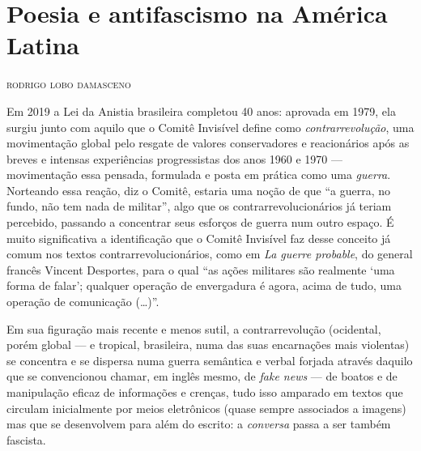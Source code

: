 \chapter[Poesia e antifascismo na América Latina]{Poesia e antifascismo na América Latina } 

\hfill\textsc{rodrigo lobo damasceno}

\bigskip

Em 2019 a Lei da Anistia brasileira completou 40 anos: aprovada em 1979,
ela surgiu junto com aquilo que o Comitê Invisível define como
\emph{contrarrevolução}, uma movimentação global pelo resgate de valores
conservadores e reacionários após as breves e intensas experiências
progressistas dos anos 1960 e 1970 --- movimentação essa pensada, formulada e
posta em prática como uma \emph{guerra}. Norteando essa reação, diz o
Comitê, estaria uma noção de que ``a guerra, no fundo, não tem nada de
militar'', algo que os contrarrevolucionários já teriam percebido,
passando a concentrar seus esforços de guerra num outro espaço. É muito
significativa a identificação que o Comitê Invisível faz desse conceito
já comum nos textos contrarrevolucionários, como em \emph{La guerre
probable}, do general francês Vincent Desportes, para o qual ``as ações
militares são realmente `uma forma de falar'; qualquer operação de
envergadura é agora, acima de tudo, uma operação de comunicação (\ldots{})''.

\asterisc

Em sua figuração mais recente e menos sutil, a contrarrevolução
(ocidental, porém global --- e tropical, brasileira, numa das suas
encarnações mais violentas) se concentra e se dispersa numa guerra
semântica e verbal forjada através daquilo que se convencionou chamar,
em inglês mesmo, de \emph{fake news} --- de boatos e de manipulação eficaz
de informações e crenças, tudo isso amparado em textos que circulam
inicialmente por meios eletrônicos (quase sempre associados a imagens)
mas que se desenvolvem para além do escrito: a \emph{conversa} passa a
ser também fascista.

\asterisc

